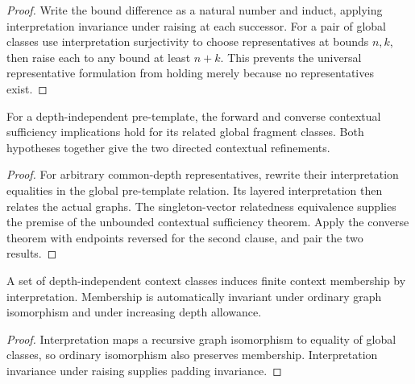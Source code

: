 \begin{proof}
Write the bound difference as a natural number and induct, applying interpretation invariance under raising at each successor. For a pair of global classes use interpretation surjectivity to choose representatives at bounds $n,k$, then raise each to any bound at least $n+k$. This prevents the universal representative formulation from holding merely because no representatives exist.
\end{proof}




\begin{lemma}
For a depth-independent pre-template, the forward and converse contextual sufficiency implications hold for its related global fragment classes. Both hypotheses together give the two directed contextual refinements.
\end{lemma}

\begin{proof}
For arbitrary common-depth representatives, rewrite their interpretation equalities in the global pre-template relation. Its layered interpretation then relates the actual graphs. The singleton-vector relatedness equivalence supplies the premise of the unbounded contextual sufficiency theorem. Apply the converse theorem with endpoints reversed for the second clause, and pair the two results.
\end{proof}






\begin{lemma}
A set of depth-independent context classes induces finite context membership by interpretation. Membership is automatically invariant under ordinary graph isomorphism and under increasing depth allowance.
\end{lemma}

\begin{proof}
Interpretation maps a recursive graph isomorphism to equality of global classes, so ordinary isomorphism also preserves membership. Interpretation invariance under raising supplies padding invariance.
\end{proof}


